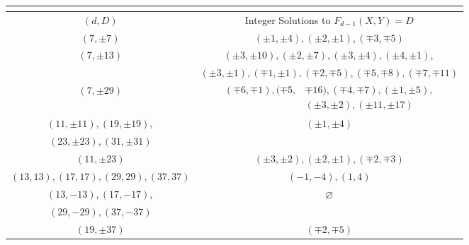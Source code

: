 \documentclass[12pt]{amsart}
\newcommand{\?}{\color{red}?}
\numberwithin{equation}{section}
\begin{document}
\begingroup
\setlength{\tabcolsep}{5pt} %
\renewcommand{\arraystretch}{1.9}
\begin{center} %
\begin{table}[!ht]
\begin{tabular}{|c|c|}
\multicolumn{2}{c}{} \\ \hline
$(d, D)$ & Integer Solutions to $F_{d-1}(X,Y)=D$  \\ \hline \hline
$(7, \pm 7)$ & $(\pm 1, \pm 4), ( \pm 2, \pm 1), (\mp 3, \mp 5)$\\ \hline
\multirow{2}{3.5em}{$(7,  \pm 13)$} & $( \pm 3,  \pm 10), (\pm 2,  \pm 7), ( \pm 3, \pm 4), (\pm 4, \pm 1),$ \\ & $( \pm 3,  \pm 1), (\mp 1, \pm 1), (\mp 2, \mp 5), (\mp 5,\mp 8), (\mp 7, \mp 11)$ \\ \hline
$(7, \pm 29)$ & $\begin{aligned}(\mp 6, \mp 1), (\mp 5, &\mp 16), (\mp 4, \mp 7), (\pm 1, \pm 5), \\&(\pm 3, \pm 2), (\pm 11, \pm 17)\end{aligned}$\\ \hline
$(11, \pm 11), (19, \pm 19),$  &\multirow{2}{3.5em}{$( \pm 1,\pm 4)$}\\ 
$(23, \pm 23), (31, \pm 31)$ &\\ \hline
$(11, \pm 23)$ & $( \pm 3, \pm 2), ( \pm 2, \pm 1), (\mp 2,\mp 3)$\\ \hline
$(13, 13), (17, 17), (29, 29), (37,37)$ & $(-1, -4), (1,4)$\\ \hline
$(13, -13),  (17, -17),$  & \multirow{2}{3.5em}{$\varnothing$}\\ 
$(29, -29), (37,-37)$ &\\ \hline
$(19, \pm 37)$ & $(\mp 2, \mp 5)$ \\ \hline
\end{tabular}
\smallskip
{}
\label{thuetable}
\end{table}
\end{center}
\endgroup

\end{document}
